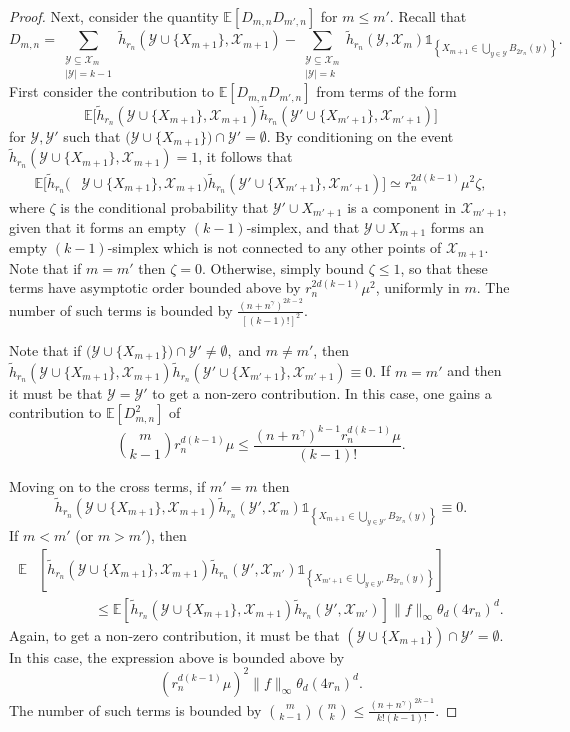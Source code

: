 \documentclass{amsart}
\theoremstyle{definition}
\newcommand{\E}{\mathbb{E}}
\newcommand{\X}{\mathcal{X}}
\newcommand{\Y}{\mathcal{Y}}
\renewcommand{\1}{\mathbb{1}}
\newcommand{\h}{\tilde{h}}
\begin{document}
\begin{proof}
Next, consider the quantity $\E[D_{m,n}D_{m',n}]$ for $m\le m'$.
Recall that 
$$D_{m,n}=\sum_{\substack{\Y\subseteq\X_m\\|\Y|=k-1}}\h_{r_n}(\Y\cup\{X_{m+1}\},
\X_{m+1})-\sum_{\substack{\Y\subseteq\X_{m}\\|\Y|=k}}\h_{r_n}(\Y,
\X_{m})\1_{\left\{X_{m+1}\in\bigcup_{y\in\Y}B_{2r_n}(y)\right\}}.$$
First consider the contribution to $\E[D_{m,n}D_{m',n}]$ from terms of the form 
$$\E\big[\h_{r_n}(\Y\cup \{X_{m+1}\},\X_{m+1})\h_{r_n}(\Y'\cup \{X_{m'+1}\},
\X_{m'+1})\big]$$ for $\Y,\Y'$ such that $\big(\Y\cup \{X_{m+1}\}\big)\cap 
\Y'=\emptyset.$
By conditioning on the event $
\h_{r_n}(\Y\cup\{X_{m+1}\},\X_{m+1})=1$, it follows that 
\begin{equation*}\begin{split}
\E[\h_{r_n}(&\Y\cup \{X_{m+1}\},\X_{m+1})\h_{r_n}(\Y'\cup\{X_{m'+1}\},\X_{m'+1})]
\simeq r_n^{2d(k-1)}\mu^2\zeta,
\end{split}\end{equation*}
where $\zeta$ is the conditional probability that $\Y'\cup X_{m'+1}$
is a component in $\X_{m'+1}$, given that it forms an empty $(k-1)$-simplex,
and that $\Y\cup X_{m+1}$ forms an empty $(k-1)$-simplex which is 
not connected to any other points of $\X_{m+1}$.  Note that
if $m=m'$ then $\zeta=0$.  Otherwise, simply bound $\zeta\le 1$, so that
these terms have asymptotic order bounded above by 
$r_n^{2d(k-1)}\mu^2$, uniformly
in $m$.  The number of such terms is bounded by $\frac{(n+n^\gamma)^{2k-2}}{
[(k-1)!]^2}.$  

Note that if
$\big(\Y\cup \{X_{m+1}\}\big)\cap \Y'\neq\emptyset,$ and $m\neq m'$,
then $\h_{r_n}(\Y\cup\{
X_{m+1}\},\X_{m+1})\h_{r_n}(\Y'\cup\{X_{m'+1}\},\X_{m'+1})\equiv 0.$  If
$m=m'$ and then it must be that $\Y=\Y'$ to get a non-zero contribution.
In this case, one gains a contribution to $\E[D_{m,n}^2]$ of 
$$\binom{m}{k-1}r_n^{d(k-1)}\mu\le\frac{(n+n^\gamma)^{k-1}r_n^{d(k-1)}\mu}{
(k-1)!}.$$

Moving on to the cross terms, if $m'=m$ then  
$$\h_{r_n}(\Y\cup\{X_{m+1}\},\X_{m+1})\h_{r_n}(\Y',\X_{m})\1_{\left\{X_{m+1}
\in\bigcup_{y\in\Y'}B_{2r_n}(y)\right\}}\equiv 0.$$
If $m<m'$ (or $m>m'$), then 
\begin{equation*}\begin{split}
\E&\left[\h_{r_n}(\Y\cup\{X_{m+1}\},\X_{m+1})\h_{r_n}(\Y',\X_{m'})\1_{\left\{X_{m'+1}
\in\bigcup_{y\in\Y'}B_{2r_n}(y)\right\}}\right]\\&\qquad\qquad
\le\E\left[\h_{r_n}(\Y\cup\{X_{
m+1}\},\X_{m+1})\h_{r_n}(\Y',\X_{m'})\right]\|f\|_\infty\theta_d(4r_n)^d.
\end{split}\end{equation*}
Again, to get a non-zero contribution, it must be that $(\Y\cup\{X_{m+1}\})
\cap\Y'=\emptyset.$  In this case, the expression above is bounded above
by 
$$(r_n^{d(k-1)}\mu)^2\|f\|_\infty\theta_d(4r_n)^d.$$
The number of such terms is bounded by $\binom{m}{k-1}\binom{m}{k}\le
\frac{(n+n^\gamma)^{2k-1}}{k!(k-1)!}.$



\end{proof}
\end{document}
